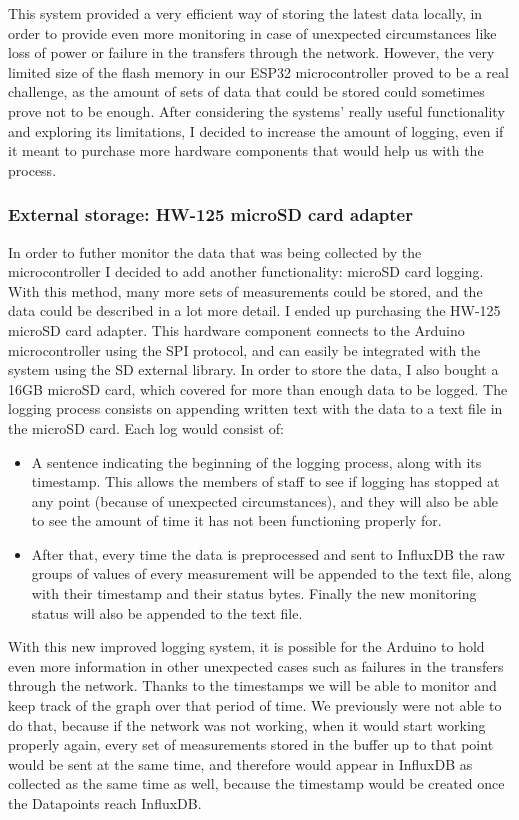 \documentclass[12pt]{article}
\begin{document}
This system provided a very efficient way of storing the latest data locally, in order to provide even more monitoring in case of unexpected circumstances like loss of power or failure in the transfers through the network. However, the very limited size of the flash memory in our ESP32 microcontroller proved to be a real challenge, as the amount of sets of data that could be stored could sometimes prove not to be enough. After considering the systems' really useful functionality and exploring its limitations, I decided to increase the amount of logging, even if it meant to purchase more hardware components that would help us with the process. 

\subsubsection{External storage: HW-125 microSD card adapter}

In order to futher monitor the data that was being collected by the microcontroller I decided to add another functionality: microSD card logging. With this method, many more sets of measurements could be stored, and the data could be described in a lot more detail. I ended up purchasing the HW-125 microSD card adapter. This hardware component connects to the Arduino microcontroller using the SPI protocol, and can easily be integrated with the system using the SD external library. In order to store the data, I also bought a 16GB microSD card, which covered for more than enough data to be logged. The logging process consists on appending written text with the data to a text file in the microSD card. Each log would consist of:

\begin{itemize}
    \item A sentence indicating the beginning of the logging process, along with its timestamp. This allows the members of staff to see if logging has stopped at any point (because of unexpected circumstances), and they will also be able to see the amount of time it has not been functioning properly for.
    \item After that, every time the data is preprocessed and sent to InfluxDB the raw groups of values of every measurement will be appended to the text file, along with their timestamp and their status bytes. Finally the new monitoring status will also be appended to the text file. 
\end{itemize}

With this new improved logging system, it is possible for the Arduino to hold even more information in other unexpected cases such as failures in the transfers through the network. Thanks to the timestamps we will be able to monitor and keep track of the graph over that period of time. We previously were not able to do that, because if the network was not working, when it would start working properly again, every set of measurements stored in the buffer up to that point would be sent at the same time, and therefore would appear in InfluxDB as collected as the same time as well, because the timestamp would be created once the Datapoints reach InfluxDB.\par 
\end{document}
